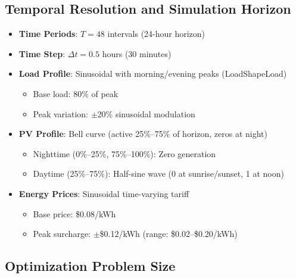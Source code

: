 \documentclass[11pt]{article}
\begin{document}
\subsection{Temporal Resolution and Simulation Horizon}

\begin{itemize}
    \item \textbf{Time Periods}: $T = 48$ intervals (24-hour horizon)
    \item \textbf{Time Step}: $\Delta t = 0.5$ hours (30 minutes)
    \item \textbf{Load Profile}: Sinusoidal with morning/evening peaks (LoadShapeLoad)
    \begin{itemize}
        \item Base load: 80\% of peak
        \item Peak variation: $\pm$20\% sinusoidal modulation
    \end{itemize}
    \item \textbf{PV Profile}: Bell curve (active 25\%--75\% of horizon, zeros at night)
    \begin{itemize}
        \item Nighttime (0\%--25\%, 75\%--100\%): Zero generation
        \item Daytime (25\%--75\%): Half-sine wave (0 at sunrise/sunset, 1 at noon)
    \end{itemize}
    \item \textbf{Energy Prices}: Sinusoidal time-varying tariff
    \begin{itemize}
        \item Base price: \$0.08/kWh
        \item Peak surcharge: $\pm$\$0.12/kWh (range: \$0.02--\$0.20/kWh)
    \end{itemize}
\end{itemize}

\subsection{Optimization Problem Size}
\end{document}
